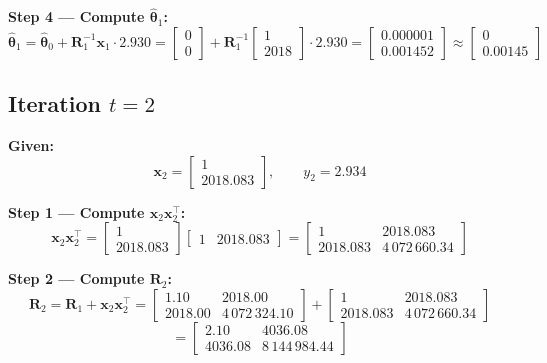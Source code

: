 \documentclass[11pt,a4paper]{article}
\begin{document}
\textbf{Step 4 --- Compute $\hat{\boldsymbol{\theta}}_1$:}
\[
\hat{\boldsymbol{\theta}}_1
= \hat{\boldsymbol{\theta}}_0 + \boldsymbol{R}_1^{-1} \boldsymbol{x}_1 \cdot 2.930
= \begin{bmatrix} 0 \\ 0 \end{bmatrix} + \boldsymbol{R}_1^{-1} \begin{bmatrix} 1 \\ 2018 \end{bmatrix} \cdot 2.930
= \begin{bmatrix} 0.000001 \\ 0.001452 \end{bmatrix}
\approx \begin{bmatrix} 0 \\ 0.00145 \end{bmatrix}
\]

\vspace{1em}

\subsection*{Iteration $t=2$}

\textbf{Given:}
\[
\boldsymbol{x}_2 = \begin{bmatrix} 1 \\ 2018.083 \end{bmatrix}, \qquad y_2 = 2.934
\]

\textbf{Step 1 --- Compute $\boldsymbol{x}_2 \boldsymbol{x}_2^\top$:}
\[
\boldsymbol{x}_2 \boldsymbol{x}_2^\top
= \begin{bmatrix} 1 \\ 2018.083 \end{bmatrix} \begin{bmatrix} 1 & 2018.083 \end{bmatrix}
= \begin{bmatrix} 1 & 2018.083 \\ 2018.083 & 4\,072\,660.34 \end{bmatrix}
\]

\textbf{Step 2 --- Compute $\boldsymbol{R}_2$:}
\[
\boldsymbol{R}_2 = \boldsymbol{R}_1 + \boldsymbol{x}_2 \boldsymbol{x}_2^\top
= \begin{bmatrix} 1.10 & 2018.00 \\ 2018.00 & 4\,072\,324.10 \end{bmatrix}
+ \begin{bmatrix} 1 & 2018.083 \\ 2018.083 & 4\,072\,660.34 \end{bmatrix}
\]
\[
= \begin{bmatrix} 2.10 & 4036.08 \\ 4036.08 & 8\,144\,984.44 \end{bmatrix}
\]
\end{document}
